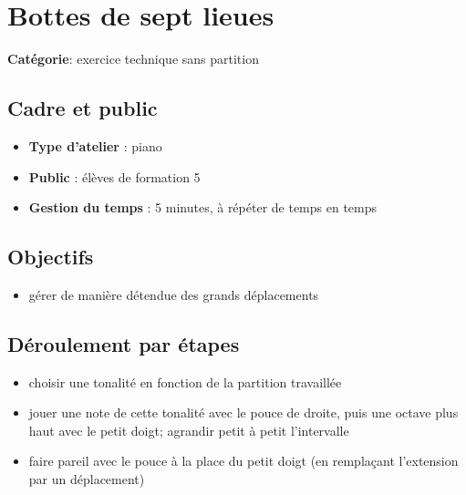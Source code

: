 \documentclass[a4paper,11pt,bibliography=totoc,numbers=noenddot,listof=flat,DIV=11,BCOR=0mm]{scrreprt}%
\begin{document}
\chapter[Exercice technique sans partition: Bottes de sept lieues]{Bottes de sept lieues}

{\large \textbf{Catégorie}}:
 exercice technique sans partition


\section*{Cadre et public}
\begin{itemize}
\item [\textbullet]\textbf{Type d'atelier} : piano

\item [\textbullet]\textbf{Public} : élèves de formation 5

\item [\textbullet]\textbf{Gestion du temps} : 5 minutes, à répéter de temps en temps

\end{itemize}

\section*{Objectifs}
\begin{itemize}
\item gérer de manière détendue des grands déplacements
\end{itemize}


\section*{Déroulement par étapes}
\begin{itemize}
\item choisir une tonalité en fonction de la partition travaillée
\item jouer une note de cette tonalité avec le pouce de droite, puis une octave plus haut avec le petit doigt; agrandir petit à petit l'intervalle
\item faire pareil avec le pouce à la place du petit doigt (en remplaçant l'extension par un déplacement)
\end{itemize}
\end{document}
